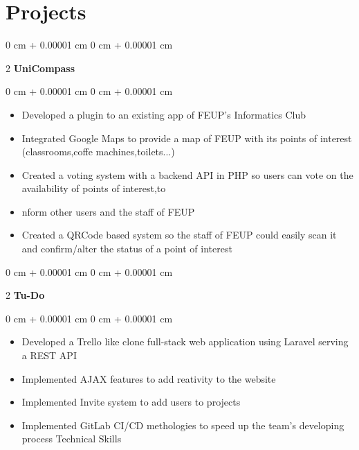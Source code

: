 \documentclass[10pt, letterpaper]{article}
\newenvironment{highlights}{
        \begin{itemize}[
            topsep=0.10 cm,
            parsep=0.10 cm,
            partopsep=0pt,
            itemsep=0pt,
            leftmargin=0 cm + 10pt
        ]
    }{
        \end{itemize}
    } %
\newenvironment{onecolentry}{
        \begin{adjustwidth}{
            0 cm + 0.00001 cm
        }{
            0 cm + 0.00001 cm
        }
    }{
        \end{adjustwidth}
    } %
\newenvironment{twocolentry}[2][]{
        \onecolentry
        \def\secondColumn{#2}
        \setcolumnwidth{\fill, 6.5cm}
        \begin{paracol}{2}
    }{
        \switchcolumn \raggedleft \secondColumn
        \end{paracol}
        \endonecolentry
    } %
\begin{document}
\section{Projects}\begin{twocolentry}{ }\textbf{UniCompass}\end{twocolentry}\vspace{0.10 cm}\begin{onecolentry}\begin{highlights}
\item Developed a plugin to an existing app of FEUP's Informatics Club

\item Integrated Google Maps to provide a map of FEUP with its points of interest (classrooms,coffe machines,toilets...)

\item Created a voting system with a backend API in PHP so users can vote on the availability of points of interest,to

\item nform other users and the staff of FEUP

\item Created a QRCode based system so the staff of FEUP could easily scan it and confirm/alter the status of a point of  interest

\end{highlights} \end{onecolentry}
\vspace{0.2 cm}
\begin{twocolentry}{ }\textbf{Tu-Do}\end{twocolentry}\vspace{0.10 cm}\begin{onecolentry}\begin{highlights}
\item Developed a Trello like clone full-stack web application using Laravel serving a REST API

\item Implemented AJAX features to add reativity to the website

\item Implemented Invite system to add users to projects

\item Implemented GitLab CI/CD methologies to speed up the team's developing process  Technical Skills

\end{highlights} \end{onecolentry}
\end{document}
